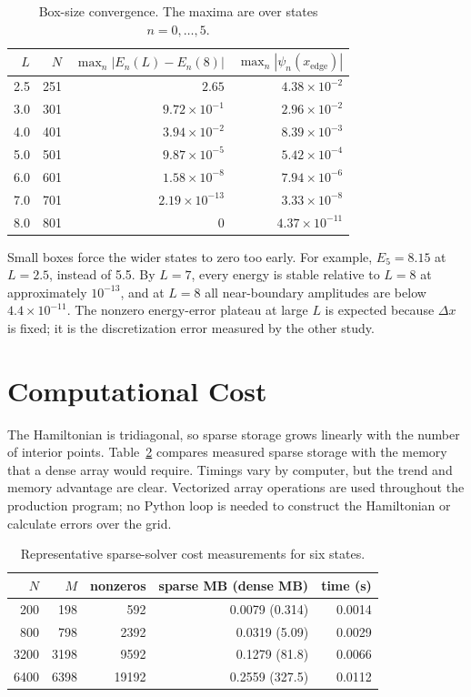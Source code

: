 \documentclass[10pt]{article}
\begin{document}
\begin{table}[h]
\centering
\small
\caption{Box-size convergence. The maxima are over states \(n=0,\ldots,5\).}
\label{tab:box}
\begin{tabular}{rrrr}
\toprule
\(L\) & \(N\) & \(\max_n|E_n(L)-E_n(8)|\) &
\(\max_n|\psi_n(x_{\mathrm{edge}})|\)\\
\midrule
2.5 & 251 & \(2.65\) & \(4.38\times10^{-2}\)\\
3.0 & 301 & \(9.72\times10^{-1}\) & \(2.96\times10^{-2}\)\\
4.0 & 401 & \(3.94\times10^{-2}\) & \(8.39\times10^{-3}\)\\
5.0 & 501 & \(9.87\times10^{-5}\) & \(5.42\times10^{-4}\)\\
6.0 & 601 & \(1.58\times10^{-8}\) & \(7.94\times10^{-6}\)\\
7.0 & 701 & \(2.19\times10^{-13}\) & \(3.33\times10^{-8}\)\\
8.0 & 801 & \(0\) & \(4.37\times10^{-11}\)\\
\bottomrule
\end{tabular}
\end{table}

Small boxes force the wider states to zero too early. For example,
\(E_5=8.15\) at \(L=2.5\), instead of 5.5. By \(L=7\), every energy is
stable relative to \(L=8\) at approximately \(10^{-13}\), and at
\(L=8\) all near-boundary amplitudes are below \(4.4\times10^{-11}\).
The nonzero energy-error plateau at large \(L\) is expected because
\(\Delta x\) is fixed; it is the discretization error measured by the
other study.

\clearpage
\section{Computational Cost}
The Hamiltonian is tridiagonal, so sparse storage grows linearly with the
number of interior points. Table~\ref{tab:cost} compares measured sparse
storage with the memory that a dense array would require. Timings vary by
computer, but the trend and memory advantage are clear. Vectorized array
operations are used throughout the production program; no Python loop is
needed to construct the Hamiltonian or calculate errors over the grid.

\begin{table}[h]
\centering
\small
\caption{Representative sparse-solver cost measurements for six states.}
\label{tab:cost}
\begin{tabular}{rrrrr}
\toprule
\(N\) & \(M\) & nonzeros & sparse MB (dense MB) & time (s)\\
\midrule
200  & 198  & 592   & 0.0079 (0.314) & 0.0014\\
800  & 798  & 2392  & 0.0319 (5.09)  & 0.0029\\
3200 & 3198 & 9592  & 0.1279 (81.8)  & 0.0066\\
6400 & 6398 & 19192 & 0.2559 (327.5) & 0.0112\\
\bottomrule
\end{tabular}
\end{table}
\end{document}
